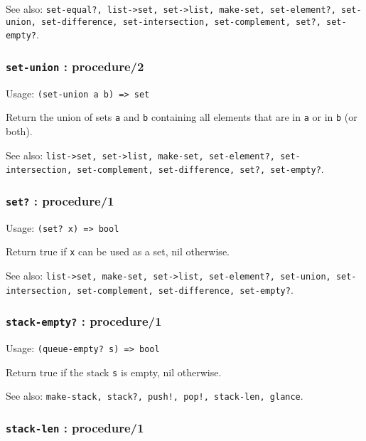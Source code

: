 \documentclass[
]{article}
\newcommand{\passthrough}[1]{#1}
\begin{document}
See also:
\passthrough{\lstinline!set-equal?, list->set, set->list, make-set, set-element?, set-union, set-difference, set-intersection, set-complement, set?, set-empty?!}.

\hypertarget{set-union-procedure2}{%
\subsubsection{\texorpdfstring{\texttt{set-union} :
procedure/2}{set-union : procedure/2}}\label{set-union-procedure2}}

Usage: \passthrough{\lstinline!(set-union a b) => set!}

Return the union of sets \passthrough{\lstinline!a!} and
\passthrough{\lstinline!b!} containing all elements that are in
\passthrough{\lstinline!a!} or in \passthrough{\lstinline!b!} (or both).

See also:
\passthrough{\lstinline!list->set, set->list, make-set, set-element?, set-intersection, set-complement, set-difference, set?, set-empty?!}.

\hypertarget{set-procedure1}{%
\subsubsection{\texorpdfstring{\texttt{set?} :
procedure/1}{set? : procedure/1}}\label{set-procedure1}}

Usage: \passthrough{\lstinline!(set? x) => bool!}

Return true if \passthrough{\lstinline!x!} can be used as a set, nil
otherwise.

See also:
\passthrough{\lstinline!list->set, make-set, set->list, set-element?, set-union, set-intersection, set-complement, set-difference, set-empty?!}.

\hypertarget{stack-empty-procedure1}{%
\subsubsection{\texorpdfstring{\texttt{stack-empty?} :
procedure/1}{stack-empty? : procedure/1}}\label{stack-empty-procedure1}}

Usage: \passthrough{\lstinline!(queue-empty? s) => bool!}

Return true if the stack \passthrough{\lstinline!s!} is empty, nil
otherwise.

See also:
\passthrough{\lstinline"make-stack, stack?, push!, pop!, stack-len, glance"}.

\hypertarget{stack-len-procedure1}{%
\subsubsection{\texorpdfstring{\texttt{stack-len} :
procedure/1}{stack-len : procedure/1}}\label{stack-len-procedure1}}
\end{document}

